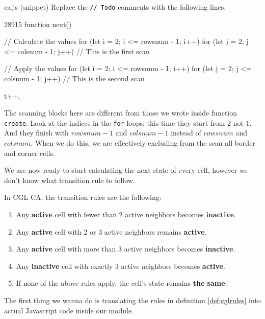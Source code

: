 \begin{programcode}{ca.js (snippet)}
Replace the \texttt{// Todo} comments with the following lines.
\begin{codeh2}{2}{8}{9}{15}
function next() {
  // Calculate the values
  for (let i = 2; i <= rowsnum - 1; i++) {
    for (let j = 2; j <= colsnum - 1; j++) {
      // This is the first scan
    }
  }

  // Apply the values
  for (let i = 2; i <= rowsnum - 1; i++) {
    for (let j = 2; j <= colsnum - 1; j++) {
      // This is the second scan
    }
  }

  t++;
}
\end{codeh2}
\end{programcode}

The scanning blocks here are different from those we wrote inside function \texttt{create}.
Look at the indices in the \texttt{for} loops: this time they start from
$2$ not $1$. And they finish with $rowsnum - 1$ and $colsnum - 1$ instead of $rowsnum$ and $colsnum$.
When we do this, we are effectively excluding from the scan all border and corner cells.

We are now ready to start calculating the next state of every cell, however we don't know what
transition rule to follow.

\begin{definition}
\label{def:cglrules}
In CGL CA, the transition rules are the following:
\begin{enumerate}
\item Any \textbf{active} cell with fewer than 2 active neighbors becomes \textbf{inactive}.
\item Any \textbf{active} cell with 2 or 3 active neighbors remains \textbf{active}.
\item Any \textbf{active} cell with more than 3 active neighbors becomes \textbf{inactive}.
\item Any \textbf{inactive} cell with exactly 3 active neighbors becomes \textbf{active}.
\item If none of the above rules apply, the cell's state remains \textbf{the same}.
\end{enumerate}
\end{definition}

The first thing we wanna do is translating the rules in definition \ref{def:cglrules} into
actual Javascript code inside our module.

